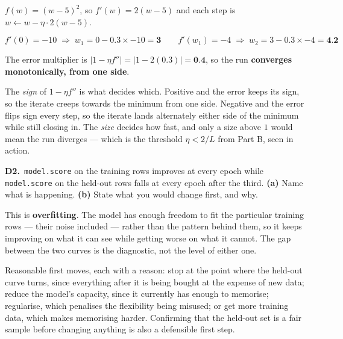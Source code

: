 \documentclass[10pt,a4paper]{article}
\newcommand{\sol}[1]{\textbf{#1}}
\begin{document}
\vspace{2pt}

$f(w) = (w-5)^2$, so $f'(w) = 2(w-5)$ and each step is $w \leftarrow w - \eta \cdot 2(w-5)$.

\[ f'(0) = -10 \;\Rightarrow\; w_1 = 0 - 0.3 \times -10 = \sol{3} \qquad f'(w_1) = -4 \;\Rightarrow\; w_2 = 3 - 0.3 \times -4 = \sol{4.2} \]

The error multiplier is $\lvert 1 - \eta f'' \rvert = \lvert 1 - 2(0.3) \rvert = \sol{0.4}$, so the run \sol{converges monotonically, from one side}.

\vspace{2pt}

The \emph{sign} of $1 - \eta f''$ is what decides which. Positive and the error keeps its sign, so the iterate creeps towards the minimum from one side. Negative and the error flips sign every step, so the iterate lands alternately either side of the minimum while still closing in. The \emph{size} decides how fast, and only a size above $1$ would mean the run diverges --- which is the threshold $\eta < 2/L$ from Part B, seen in action.

\vspace{6pt}

\textbf{D2.}\ \texttt{model.score} on the training rows improves at every epoch while \texttt{model.score} on the held-out rows falls at every epoch after the third. \textbf{(a)} Name what is happening. \textbf{(b)} State what you would change first, and why.

\vspace{2pt}

This is \textbf{overfitting}. The model has enough freedom to fit the particular training rows --- their noise included --- rather than the pattern behind them, so it keeps improving on what it can see while getting worse on what it cannot. The gap between the two curves is the diagnostic, not the level of either one.\par\vspace{1mm}Reasonable first moves, each with a reason: stop at the point where the held-out curve turns, since everything after it is being bought at the expense of new data; reduce the model's capacity, since it currently has enough to memorise; regularise, which penalises the flexibility being misused; or get more training data, which makes memorising harder. Confirming that the held-out set is a fair sample before changing anything is also a defensible first step.

\newpage
\end{document}
